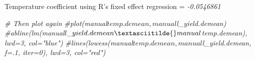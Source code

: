 \documentclass[
]{article}
\newenvironment{Shaded}{\begin{snugshade}}{\end{snugshade}}
\newcommand{\CommentTok}[1]{\textcolor[rgb]{0.56,0.35,0.01}{\textit{#1}}}
\begin{document}
Temperature coefficient using R's fixed effect regression =
\emph{-0.0546861}

\begin{Shaded}
\begin{Highlighting}[]
\CommentTok{\# Then plot again}
\CommentTok{\#plot(manual$temp.demean, manual$l\_yield.demean)}
\CommentTok{\#abline(lm(manual$l\_yield.demean\textasciitilde{}manual$temp.demean), lwd=3, col="blue")}
\CommentTok{\#lines(lowess(manual$temp.demean, manual$l\_yield.demean, f=.1, iter=0), lwd=3, col="red")}
\end{Highlighting}
\end{Shaded}
\end{document}
